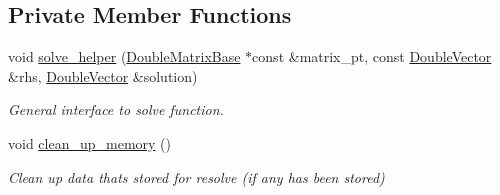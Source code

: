 \subsection*{Private Member Functions}
\begin{DoxyCompactItemize}
\item 
void \hyperlink{classoomph_1_1GS_3_01CRDoubleMatrix_01_4_a12a720316ec6fde47e0fa524bd8728b1}{solve\+\_\+helper} (\hyperlink{classoomph_1_1DoubleMatrixBase}{Double\+Matrix\+Base} $\ast$const \&matrix\+\_\+pt, const \hyperlink{classoomph_1_1DoubleVector}{Double\+Vector} \&rhs, \hyperlink{classoomph_1_1DoubleVector}{Double\+Vector} \&solution)
\begin{DoxyCompactList}\small\item\em General interface to solve function. \end{DoxyCompactList}\item 
void \hyperlink{classoomph_1_1GS_3_01CRDoubleMatrix_01_4_a6e5470c508a10e89dd110463c7cea89a}{clean\+\_\+up\+\_\+memory} ()
\begin{DoxyCompactList}\small\item\em Clean up data that\textquotesingle{}s stored for resolve (if any has been stored) \end{DoxyCompactList}\end{DoxyCompactItemize}
